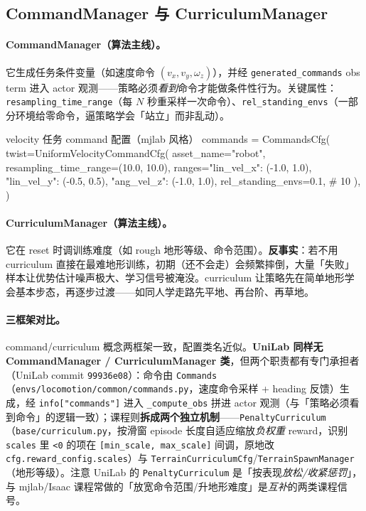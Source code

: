 \subsection{CommandManager 与 CurriculumManager}
\label{sec:rlmc-mgr-cmd}

\paragraph{CommandManager（算法主线）。}它生成任务条件变量（如速度命令 $(v_x,v_y,\omega_z)$），并经 \verb|generated_commands| obs term 进入 actor 观测——策略必须\emph{看到}命令才能做条件性行为。关键属性：\verb|resampling_time_range|（每 $N$ 秒重采样一次命令）、\verb|rel_standing_envs|（一部分环境给零命令，逼策略学会「站立」而非乱动）。

\begin{codebox}[Python]{velocity 任务 command 配置（mjlab 风格）}
commands = CommandsCfg(
    twist=UniformVelocityCommandCfg(
        asset_name="robot", resampling_time_range=(10.0, 10.0),
        ranges={"lin_vel_x": (-1.0, 1.0), "lin_vel_y": (-0.5, 0.5),
                "ang_vel_z": (-1.0, 1.0)},
        rel_standing_envs=0.1,   # 10%
    ),
)
\end{codebox}

\paragraph{CurriculumManager（算法主线）。}它在 reset 时调训练难度（如 rough 地形等级、命令范围）。\textbf{反事实}：若不用 curriculum 直接在最难地形训练，初期（还不会走）会频繁摔倒，大量「失败」样本让优势估计噪声极大、学习信号被淹没。curriculum 让策略先在简单地形学会基本步态，再逐步过渡——如同人学走路先平地、再台阶、再草地。

\paragraph{三框架对比。}command/curriculum 概念两框架一致，配置类名近似。\textbf{UniLab 同样无 CommandManager / CurriculumManager 类}，但两个职责都有专门承担者（UniLab commit \texttt{99936e08}）：命令由 \verb|Commands|（\texttt{envs/locomotion/common/commands.py}，速度命令采样 + heading 反馈）生成，经 \verb|info["commands"]| 进入 \verb|_compute_obs| 拼进 actor 观测（与「策略必须看到命令」的逻辑一致）；课程则\textbf{拆成两个独立机制}——\verb|PenaltyCurriculum|（\texttt{base/curriculum.py}，按滑窗 episode 长度自适应缩放\emph{负权重} reward，识别 \verb|scales| 里 \verb|<0| 的项在 \verb|[min_scale, max_scale]| 间调，原地改 \verb|cfg.reward_config.scales|）与 \verb|TerrainCurriculumCfg|/\verb|TerrainSpawnManager|（地形等级）。注意 UniLab 的 \verb|PenaltyCurriculum| 是「按表现\emph{放松/收紧惩罚}」，与 mjlab/Isaac 课程常做的「放宽命令范围/升地形难度」是\emph{互补}的两类课程信号。

